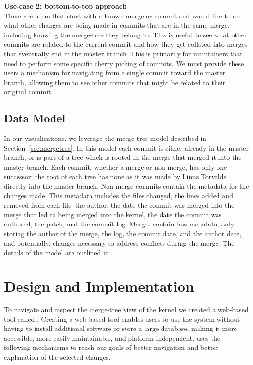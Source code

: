 \documentclass[conference, draftclsnofoot, draft]{IEEEtran}
\begin{document}
\noindent \textbf{Use-case 2: bottom-to-top approach}\label{sec:usecase2}\\
These are users that start with a known merge or commit and would like to see what
other changes are being made in commits that are in the same merge, including
knowing the merge-tree they belong to. This is useful to see what other commits are
related to the current commit and how they get collated into merges that eventually
end in the master branch. This is primarily for maintainers that need to perform
some specific cherry picking of commits. We must provide these users a mechanism for
navigating from a single commit toward the master branch, allowing them to see other
commits that might be related to their original commit.

\subsection{Data Model}

In our visualizations, we leverage the merge-tree model described in
Section~\ref{sec:mergetree}. In this model each commit is either already in the
master branch, or is part of a tree which is rooted in the merge that merged it into
the master branch.  Each commit, whether a merge or non-merge, has only one
successor; the root of each tree has none as it was made by Linus Torvalds directly
into the master branch. Non-merge commits contain the metadata for the changes made.
This metadata includes the files changed, the lines added and removed from each
file, the author, the date the commit was merged into the merge that led to being
merged into the kernel, the date the commit was authored, the patch, and the commit
log. Merges contain less metadata, only storing the author of the merge, the log,
the commit date, and the author date, and potentially, changes necessary to address
conflicts during the merge. The details of the model are outlined in
\cite{German2015}.

\section{Design and Implementation}

To navigate and inspect the merge-tree view of the kernel we created a web-based
tool called \tool. Creating a web-based tool enables users to use the system without
having to install additional software or store a large database, making it more
accessible, more easily maintainable, and platform independent. \tool uses the
following mechanisms to reach our goals of better navigation and better explanation
of the selected changes.
\end{document}
